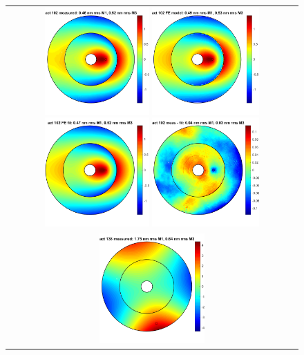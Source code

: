 \documentclass [twoside,openbib,12pt]{article}
\begin{document}
 \begin{figure}[bthp]
   \begin{center}
     \begin{tabular}{c}
       \includegraphics[width=40mm]{figures/if102m.png}
       \includegraphics[width=41mm]{figures/if102f.png}
       \includegraphics[width=40mm]{figures/if102fit.png}
       \includegraphics[width=41mm]{figures/if102r.png} \\
       \includegraphics[width=40mm]{figures/if138m.png}

\end{tabular}
\end{center}
\end{figure}
\end{document}
